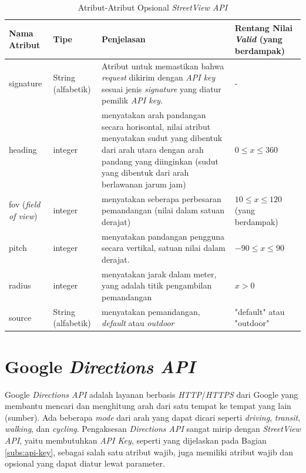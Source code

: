 \begin{table}[ht!]
	\centering
	\caption{Atribut-Atribut Opsional \textit{StreetView API}}
	\label{tab:atribut-opsional-streetview-api}
\begin{tabular}{|p{2.5cm}|p{3cm}|p{5cm}|p{4cm}|}
\hline
Nama Atribut & Tipe & Penjelasan & Rentang Nilai \textit{Valid} (yang berdampak)\\ \hline \hline
signature & String (alfabetik) &  Atribut untuk memastikan bahwa \textit{request} dikirim dengan {\it API key} sesuai jenis \textit{signature} yang diatur pemilik {\it API key}. & - \\ \hline
heading & integer & menyatakan arah pandangan secara horisontal, nilai atribut menyatakan sudut yang dibentuk dari arah utara dengan arah pandang yang diinginkan (sudut yang dibentuk dari arah berlawanan jarum jam) & $ 0 \leq x \leq 360 $ \\ \hline
fov (\textit{field of view}) & integer & menyatakan seberapa perbesaran pemandangan (nilai dalam satuan derajat) & $ 10 \leq x \leq 120 $ (yang berdampak)\\ \hline
pitch & integer & menyatakan pandangan pengguna secara vertikal, satuan nilai dalam derajat.& $ -90 \leq  x \leq 90$\\ \hline
radius & integer & menyatakan jarak dalam meter, yang adalah titik pengambilan pemandangan & $ x > 0 $\\ \hline
source & String (alfabetik) & menyatakan pemandangan, \textit{default} atau \textit{outdoor} & "default" atau "outdoor"\\ 
\hline

\end{tabular}
\end{table}

\section{Google {\it Directions API}}
\label{sec:directions}
Google {\it Directions API} adalah layanan berbasis \textit{HTTP}/\textit{HTTPS} dari Google yang membantu mencari dan menghitung arah dari satu tempat ke tempat yang lain (sumber). Ada beberapa \textit{mode} dari arah yang dapat dicari seperti {\it driving}, {\it transit}, {\it walking}, dan {\it cycling}. Pengaksesan \textit{Directions API} sangat mirip dengan {\it StreetView API}, yaitu membutuhkan \textit{API Key}, seperti yang dijelaskan pada Bagian \ref{subs:api-key}, sebagai salah satu atribut wajib, juga memiliki atribut wajib dan opsional yang dapat diatur lewat parameter. 

